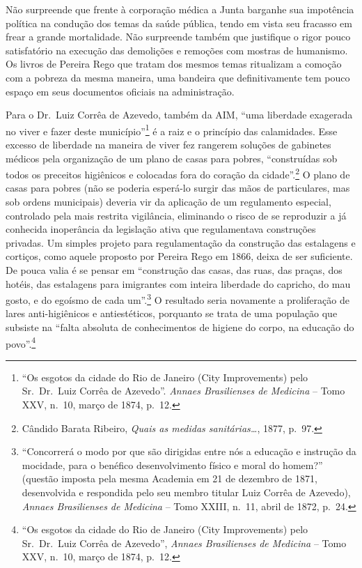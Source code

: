 Não surpreende que frente à corporação médica a Junta barganhe sua
impotência política na condução dos temas da saúde pública, tendo em
vista seu fracasso em frear a grande mortalidade. Não surpreende também
que justifique o rigor pouco satisfatório na execução das demolições e
remoções com mostras de humanismo. Os livros de Pereira Rego que tratam
dos mesmos temas ritualizam a comoção com a pobreza da mesma maneira,
uma bandeira que definitivamente tem pouco espaço em seus documentos
oficiais na administração.

Para o Dr.~Luiz Corrêa de Azevedo, também da AIM, ``uma liberdade
exagerada no viver e fazer deste município''\footnote{``Os esgotos da
  cidade do Rio de Janeiro (City Improvements) pelo Sr.~Dr.~Luiz Corrêa
  de Azevedo''. \emph{Annaes Brasilienses de Medicina} -- Tomo XXV,
  n.~10, março de 1874, p.~12.} é a raiz e o princípio das calamidades.
Esse excesso de liberdade na maneira de viver fez rangerem soluções de
gabinetes médicos pela organização de um plano de casas para pobres,
``construídas sob todos os preceitos higiênicos e colocadas fora do
coração da cidade''.\footnote{Cândido Barata Ribeiro, \emph{Quais as
  medidas sanitárias\ldots{}}, 1877, p.~97.} O plano de casas para
pobres (não se poderia esperá-lo surgir das mãos de particulares, mas
sob ordens municipais) deveria vir da aplicação de um regulamento
especial, controlado pela mais restrita vigilância, eliminando o risco
de se reproduzir a já conhecida inoperância da legislação ativa que
regulamentava construções privadas. Um simples projeto para
regulamentação da construção das estalagens e cortiços, como aquele
proposto por Pereira Rego em 1866, deixa de ser suficiente. De pouca
valia é se pensar em ``construção das casas, das ruas, das praças, dos
hotéis, das estalagens para imigrantes com inteira liberdade do
capricho, do mau gosto, e do egoísmo de cada um''.\footnote{``Concorrerá
  o modo por que são dirigidas entre nós a educação e instrução da
  mocidade, para o benéfico desenvolvimento físico e moral do homem?''
  (questão imposta pela mesma Academia em 21 de dezembro de 1871,
  desenvolvida e respondida pelo seu membro titular Luiz Corrêa de
  Azevedo), \emph{Annaes Brasilienses de Medicina} -- Tomo XXIII, n.~11,
  abril de 1872, p.~24.} O resultado seria novamente a proliferação de
lares anti-higiênicos e antiestéticos, porquanto se trata de uma
população que subsiste na ``falta absoluta de conhecimentos de higiene
do corpo, na educação do povo''.\footnote{``Os esgotos da cidade do Rio
  de Janeiro (City Improvements) pelo Sr.~Dr.~Luiz Corrêa de Azevedo'',
  \emph{Annaes Brasilienses de Medicina} -- Tomo XXV, n.~10, março de
  1874, p.~12.}

